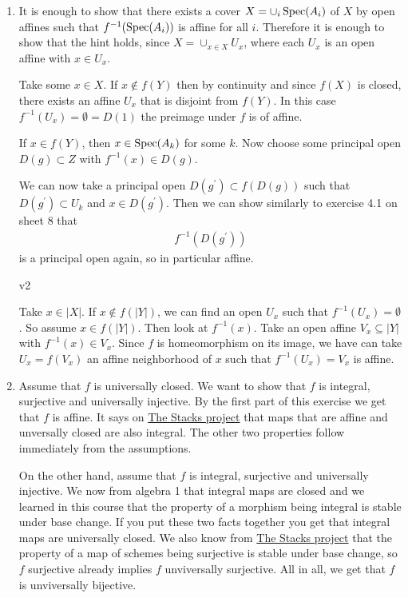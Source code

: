 \begin{exercise}{2}
    \begin{enumerate}
        \item{It is enough to show that there exists a cover $X=\cup_i \operatorname{Spec}(A_i)$ of $X$ by open affines 
        such that $f^{-1}(\operatorname{Spec}(A_i))$ is affine for all $i$. Therefore it is enough to show that the hint holds,
        since $X=\cup_{x\in X} U_x$, where each $U_x$ is an open affine with $x\in U_x$.

        Take some $x\in X$. If $x \not \in f(Y)$ then by continuity and since $f(X)$ is closed, 
        there exists an affine $U_x$ that is disjoint from $f(Y)$. In this case $f^{-1}(U_x)=\emptyset=D(1)$ the preimage under 
        $f$ is of affine.
        
        If $x\in f(Y)$, then $x\in \operatorname{Spec}(A_k)$ for some $k$. 
        Now choose some principal open $D(g)\subset Z$ with $f^{-1}(x)\in D(g)$. 

        We can now take a principal open $D(g^\prime) \subset f(D(g))$ such that $D(g^\prime) \subset U_k$ and $x\in D(g^\prime)$.
        Then we can show similarly to exercise 4.1 on sheet 8 that 
        \begin{align*}
            f^{-1}(D(g^\prime))
        \end{align*}
        is a principal open again, so in particular affine.
                

        v2

        Take $x \in |X|$. If $x \notin f(|Y|)$, we can find an open
                $U_x$ such that $f^{-1} (U_x) = \emptyset$. So assume $x \in
                f(|Y|)$. Then look at $f^{-1}(x)$. Take an open affine $V_x
                \subseteq |Y|$ with $f^{-1} (x) \in V_x$. Since $f$ is
                homeomorphism on its image, we have can take $U_x = f(V_x)$ an
                affine neighborhood of $x$ such that $f^{-1}(U_x) = V_x$ is
                affine.
            }
        \item{Assume that $f$ is universally closed. We want to show that $f$ is integral, surjective and universally injective.
        By the first part of this exercise we get that $f$ is affine. It says on \href{https://stacks.math.columbia.edu/tag/01WM}{The Stacks project} 
        that maps that are affine and unversally closed are also integral.
        The other two properties follow immediately from the assumptions.

        On the other hand, assume that $f$ is integral, surjective and universally injective. 
        We now from algebra 1 that integral maps are closed and we learned in this course that the property of a morphism
        being integral is stable under base change. If you put these two facts together you get that integral maps are universally
        closed.
        We also know from \href{https://stacks.math.columbia.edu/tag/01S1}{The Stacks project} that the property of a map of schemes
        being surjective is stable under base change, so $f$ surjective already implies $f$ unviversally surjective. All in all, we get
        that $f$ is unviversally bijective.
            }
    \end{enumerate}
\end{exercise}


